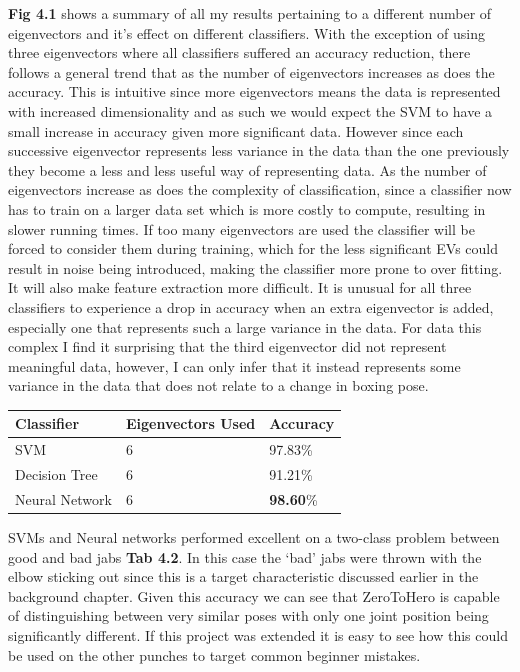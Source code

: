{\bf Fig 4.1} shows a summary of all my results pertaining to a different number of eigenvectors and it's effect on different classifiers.
With the exception of using three eigenvectors where all classifiers suffered an accuracy reduction, there follows a general trend that as the number of eigenvectors increases as does the accuracy. This is intuitive since more eigenvectors means the data is represented with increased dimensionality and as such we would expect the SVM to have a small increase in accuracy given more significant data. However since each successive eigenvector represents less variance in the data than the one previously they become a less and less useful way of representing data. 
As the number of eigenvectors increase as does the complexity of classification, since a classifier now has to train on a larger data set which is more costly to compute, resulting in slower running times. If too many eigenvectors are used the classifier will be forced to consider them during training, which for the less significant EVs could result in noise being introduced, making the classifier more prone to over fitting. It will also make feature extraction more difficult.
It is unusual for all three classifiers to experience a drop in accuracy when an extra eigenvector is added, especially one that represents such a large variance in the data. For data this complex I find it surprising that the third eigenvector did not represent meaningful data, however, I can only infer that it instead represents some variance in the data that does not relate to a change in boxing pose.


\begin{table}[h]
\begin{center}
    \begin{tabular}{ | l | l | l |}
    \hline
    Classifier & Eigenvectors Used & Accuracy\\ \hline
    SVM & 6 & 97.83\%\\ \hline
    Decision Tree & 6 & 91.21\%\\ \hline
    Neural Network & 6 & {\bf98.60}\%\\ \hline
    \hline
    \end{tabular}
\end{center}
\end{table}

SVMs and Neural networks performed excellent on a two-class problem between good and bad jabs {\bf Tab 4.2}. In this case the `bad' jabs were thrown with the elbow sticking out since this is a target characteristic discussed earlier in the background chapter. Given this accuracy we can see that ZeroToHero is capable of distinguishing between very similar poses with only one joint position being significantly different. If this project was extended it is easy to see how this could be used on the other punches to target common beginner mistakes.

